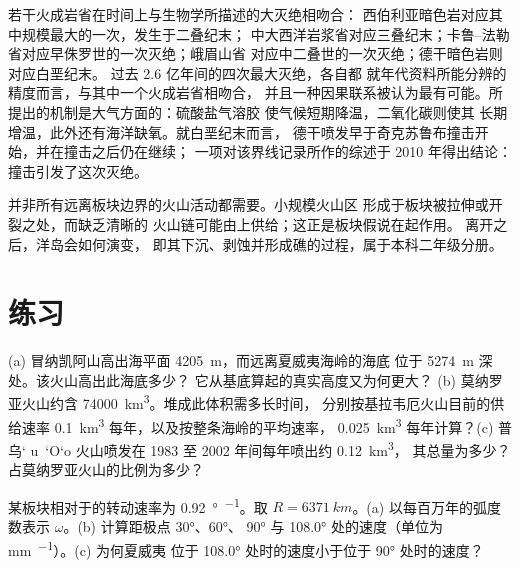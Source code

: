 若干火成岩省在时间上与生物学所描述的大灭绝相吻合：
西伯利亚暗色岩对应其中规模最大的一次，发生于二叠纪末；
中大西洋岩浆省对应三叠纪末；卡鲁–法勒
省对应早侏罗世的一次灭绝；峨眉山省
对应中二叠世的一次灭绝；德干暗色岩则对应白垩纪末。
过去 2.6 亿年间的四次最大灭绝，各自都
就年代资料所能分辨的精度而言，与其中一个火成岩省相吻合，
并且一种因果联系被认为最有可能。所提出的机制是大气方面的：硫酸盐气溶胶
使气候短期降温，二氧化碳则使其
长期增温，此外还有海洋缺氧。就白垩纪末而言，
德干喷发早于奇克苏鲁布撞击开始，并在撞击之后仍在继续；
一项对该界线记录所作的综述于 2010 年得出结论：
撞击引发了这次灭绝。

并非所有远离板块边界的火山活动都需要。小规模火山区
形成于板块被拉伸或开裂之处，而缺乏清晰的
火山链可能由上供给；这正是板块假说在起作用。
离开之后，洋岛会如何演变，
即其下沉、剥蚀并形成礁的过程，属于本科二年级分册。

\section{练习}

\begin{exercise}[$\star$]\label{exo:b1:hotspots:1}
(a) 冒纳凯阿山高出海平面 \qty{4205}{m}，而远离夏威夷海岭的海底
位于 \qty{5274}{m} 深处。该火山高出此海底多少？
它从基底算起的真实高度又为何更大？
(b) 莫纳罗亚火山约含 \qty{74000}{km^3}。堆成此体积需多长时间，
分别按基拉韦厄火山目前的供给速率 \qty{0.1}{km^3} 每年，以及按整条海岭的平均速率，
\qty{0.025}{km^3} 每年计算？(c) 普乌\textquoteleft
u~\textquoteleft O\textquoteleft o 火山喷发在 1983 至 2002 年间每年喷出约 \qty{0.12}{km^3}，
其总量为多少？占莫纳罗亚火山的比例为多少？
\end{exercise}

\begin{exercise}[$\star$]\label{exo:b1:hotspots:2}
某板块相对于的转动速率为 \qty{0.92}{\degree\per\Ma}。取
$R = \qty{6371}{km}$。(a) 以每百万年的弧度数表示 $\omega$。(b)
计算距极点 \ang{30}、\ang{60}、
\ang{90} 与 \ang{108.0} 处的速度（单位为 \unit{mm.^{-1}}）。(c) 为何夏威夷
位于 \ang{108.0} 处时的速度小于位于 \ang{90} 处时的速度？
\end{exercise}


